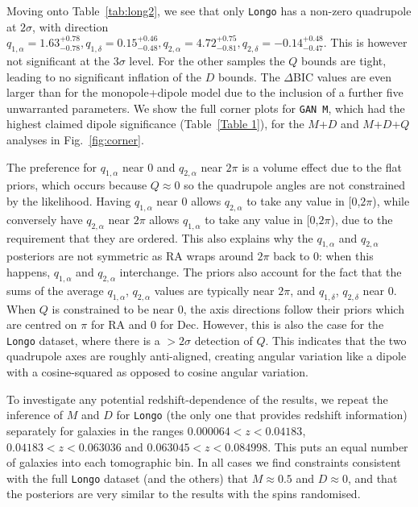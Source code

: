 \documentclass[fleqn,usenatbib,nofootinbib]{mnras}
\begin{document}
Moving onto Table~\ref{tab:long2}, we see that only \texttt{Longo} has a non-zero quadrupole at $2\sigma$, with direction $q_{1, \alpha}=1.63^{+0.78}_{-0.78}, q_{1, \delta} = 0.15^{+0.46}_{-0.48}, q_{2, \alpha} = 4.72^{+0.75}_{-0.81}, q_{2, \delta}=-0.14^{+0.48}_{-0.47}$. This is however not significant at the $3\sigma$ level. For the other samples the $Q$ bounds are tight, leading to no significant inflation of the $D$ bounds. The $\Delta$BIC values are even larger than for the monopole+dipole model due to the inclusion of a further five unwarranted parameters. We show the full corner plots for \texttt{GAN M}, which had the highest claimed dipole significance (Table~\ref{Table 1}), for the $M$+$D$ and $M$+$D$+$Q$ analyses in Fig.~\ref{fig:corner}.

The preference for $q_{1, \alpha}$ near 0 and $q_{2, \alpha}$ near $2\pi$ is a volume effect due to the flat priors, which occurs because $Q\approx0$ so the quadrupole angles are not constrained by the likelihood. Having $q_{1, \alpha}$ near 0 allows $q_{2, \alpha}$ to take any value in [0,$2\pi$), while conversely have $q_{2, \alpha}$ near $2\pi$ allows $q_{1, \alpha}$ to take any value in [0,$2\pi$), due to the requirement that they are ordered. This also explains why the $q_{1, \alpha}$ and $q_{2, \alpha}$ posteriors are not symmetric as RA wraps around $2\pi$ back to 0: when this happens, $q_{1, \alpha}$ and $q_{2, \alpha}$ interchange. The priors also account for the fact that the sums of the average $q_{1, \alpha}$, $q_{2, \alpha}$ values are typically near $2\pi$, and $q_{1, \delta}$, $q_{2, \delta}$ near 0. When $Q$ is constrained to be near 0, the axis directions follow their priors which are centred on $\pi$ for RA and 0 for Dec. However, this is also the case for the \texttt{Longo} dataset, where there is a $>2\sigma$ detection of $Q$. This indicates that the two quadrupole axes are roughly anti-aligned, creating angular variation like a dipole with a cosine-squared as opposed to cosine angular variation.

To investigate any potential redshift-dependence of the results, we repeat the inference of $M$ and $D$ for \texttt{Longo} (the only one that provides redshift information) separately for galaxies in the ranges $0.000064<z<0.04183$, $0.04183<z<0.063036$ and $0.063045<z<0.084998$. This puts an equal number of galaxies into each tomographic bin. In all cases we find constraints consistent with the full \texttt{Longo} dataset (and the others) that $M\approx0.5$ and $D\approx0$, and that the posteriors are very similar to the results with the spins randomised.
\end{document}
